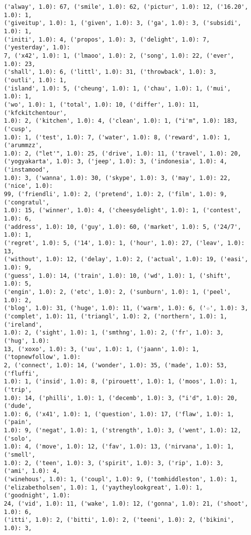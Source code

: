 \documentclass[11pt]{article}
\begin{document}
\begin{Verbatim}[commandchars=\\\{\}]
('alway', 1.0): 67, ('smile', 1.0): 62, ('pictur', 1.0): 12, ('16.20', 1.0): 1,
('giveitup', 1.0): 1, ('given', 1.0): 3, ('ga', 1.0): 3, ('subsidi', 1.0): 1,
('initi', 1.0): 4, ('propos', 1.0): 3, ('delight', 1.0): 7, ('yesterday', 1.0):
7, ('x42', 1.0): 1, ('lmaoo', 1.0): 2, ('song', 1.0): 22, ('ever', 1.0): 23,
('shall', 1.0): 6, ('littl', 1.0): 31, ('throwback', 1.0): 3, ('outli', 1.0): 1,
('island', 1.0): 5, ('cheung', 1.0): 1, ('chau', 1.0): 1, ('mui', 1.0): 1,
('wo', 1.0): 1, ('total', 1.0): 10, ('differ', 1.0): 11, ('kfckitchentour',
1.0): 2, ('kitchen', 1.0): 4, ('clean', 1.0): 1, ("i'm", 1.0): 183, ('cusp',
1.0): 1, ('test', 1.0): 7, ('water', 1.0): 8, ('reward', 1.0): 1, ('arummzz',
1.0): 2, ("let'", 1.0): 25, ('drive', 1.0): 11, ('travel', 1.0): 20,
('yogyakarta', 1.0): 3, ('jeep', 1.0): 3, ('indonesia', 1.0): 4, ('instamood',
1.0): 3, ('wanna', 1.0): 30, ('skype', 1.0): 3, ('may', 1.0): 22, ('nice', 1.0):
99, ('friendli', 1.0): 2, ('pretend', 1.0): 2, ('film', 1.0): 9, ('congratul',
1.0): 15, ('winner', 1.0): 4, ('cheesydelight', 1.0): 1, ('contest', 1.0): 6,
('address', 1.0): 10, ('guy', 1.0): 60, ('market', 1.0): 5, ('24/7', 1.0): 1,
('regret', 1.0): 5, ('14', 1.0): 1, ('hour', 1.0): 27, ('leav', 1.0): 13,
('without', 1.0): 12, ('delay', 1.0): 2, ('actual', 1.0): 19, ('easi', 1.0): 9,
('guess', 1.0): 14, ('train', 1.0): 10, ('wd', 1.0): 1, ('shift', 1.0): 5,
('engin', 1.0): 2, ('etc', 1.0): 2, ('sunburn', 1.0): 1, ('peel', 1.0): 2,
('blog', 1.0): 31, ('huge', 1.0): 11, ('warm', 1.0): 6, ('☆', 1.0): 3,
('complet', 1.0): 11, ('triangl', 1.0): 2, ('northern', 1.0): 1, ('ireland',
1.0): 2, ('sight', 1.0): 1, ('smthng', 1.0): 2, ('fr', 1.0): 3, ('hug', 1.0):
13, ('xoxo', 1.0): 3, ('uu', 1.0): 1, ('jaann', 1.0): 1, ('topnewfollow', 1.0):
2, ('connect', 1.0): 14, ('wonder', 1.0): 35, ('made', 1.0): 53, ('fluffi',
1.0): 1, ('insid', 1.0): 8, ('pirouett', 1.0): 1, ('moos', 1.0): 1, ('trip',
1.0): 14, ('philli', 1.0): 1, ('decemb', 1.0): 3, ("i'd", 1.0): 20, ('dude',
1.0): 6, ('x41', 1.0): 1, ('question', 1.0): 17, ('flaw', 1.0): 1, ('pain',
1.0): 9, ('negat', 1.0): 1, ('strength', 1.0): 3, ('went', 1.0): 12, ('solo',
1.0): 4, ('move', 1.0): 12, ('fav', 1.0): 13, ('nirvana', 1.0): 1, ('smell',
1.0): 2, ('teen', 1.0): 3, ('spirit', 1.0): 3, ('rip', 1.0): 3, ('ami', 1.0): 4,
('winehous', 1.0): 1, ('coupl', 1.0): 9, ('tomhiddleston', 1.0): 1,
('elizabetholsen', 1.0): 1, ('yaytheylookgreat', 1.0): 1, ('goodnight', 1.0):
24, ('vid', 1.0): 11, ('wake', 1.0): 12, ('gonna', 1.0): 21, ('shoot', 1.0): 6,
('itti', 1.0): 2, ('bitti', 1.0): 2, ('teeni', 1.0): 2, ('bikini', 1.0): 3,

\end{Verbatim}
\end{document}
